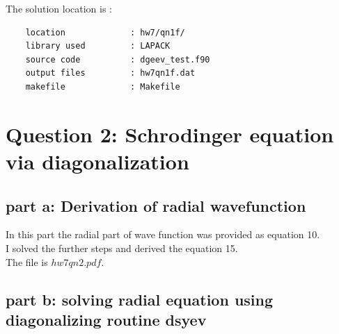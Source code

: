 \documentclass[11pt,a4paper,english]{article}
\begin{document}
	
	    
    The solution location is :\\
    \begin{verbatim}
	location             : hw7/qn1f/
	library used         : LAPACK
	source code          : dgeev_test.f90
	output files         : hw7qn1f.dat
	makefile             : Makefile
	\end{verbatim}

\clearpage	
\section{Question 2: Schrodinger equation via diagonalization }

   	
	\subsection{part a: Derivation of radial wavefunction}
	
	In this part the radial part of wave function was provided as equation 10.\\
	I solved the further steps and derived the equation 15.\\
	The file is $hw7qn2.pdf$.
	
	\subsection{part b: solving radial equation using diagonalizing routine dsyev}
	
\end{document}
